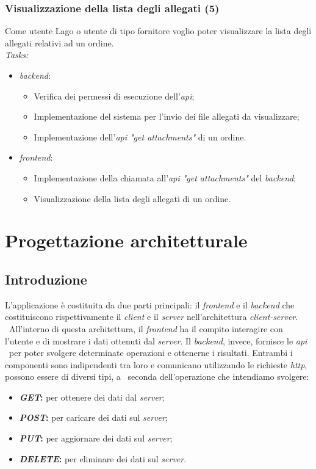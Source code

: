 \subsubsection{Visualizzazione della lista degli allegati (5)}
Come utente Lago o utente di tipo fornitore voglio poter visualizzare la lista degli allegati relativi ad un ordine. \\
\emph{Tasks:}
\begin{itemize}
  \item \emph{\Gls{backend}}:
    \begin{itemize}
      \item Verifica dei permessi di esecuzione dell'\emph{\acrshort{api}};
      \item Implementazione del sistema per l'invio dei file allegati da visualizzare;
      \item Implementazione dell'\emph{\acrshort{api} "get attachments"} di un ordine.
    \end{itemize}
  \item \emph{\Gls{frontend}}:
    \begin{itemize}
      \item Implementazione della chiamata all'\emph{\acrshort{api} "get attachments"} del \emph{\gls{backend}};
      \item Visualizzazione della lista degli allegati di un ordine.
    \end{itemize}
\end{itemize}

\section{Progettazione architetturale}

\subsection{Introduzione}
L'applicazione è costituita da due parti principali: il \emph{\gls{frontend}} e il \emph{\gls{backend}} che costituiscono rispettivamente il \emph{client} e il \emph{server} nell'architettura \emph{client-server}. \
All'interno di questa architettura, il \emph{\gls{frontend}} ha il compito interagire con l'utente e di mostrare i dati ottenuti dal \emph{server}. Il \emph{\gls{backend}}, invece, fornisce le \emph{\acrshort{api}} \
per poter svolgere determinate operazioni e ottenerne i risultati. Entrambi i componenti sono indipendenti tra loro e comunicano utilizzando le richieste \emph{\acrshort{http}}, possono essere di diversi tipi, a \
seconda dell'operazione che intendiamo svolgere: 
\begin{itemize}
  \item \textbf{\emph{GET}:} per ottenere dei dati dal \emph{server};
  \item \textbf{\emph{POST}:} per caricare dei dati sul \emph{server};
  \item \textbf{\emph{PUT}:} per aggiornare dei dati sul \emph{server};
  \item \textbf{\emph{DELETE}:} per eliminare dei dati sul \emph{server}.
\end{itemize} 

